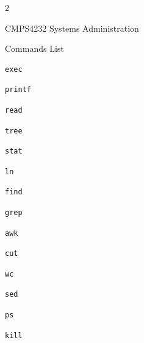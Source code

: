 \documentclass[10pt]{article}
\begin{document}
\begin{multicols*}{2}

\begin{center}
     \Large{CMPS4232 Systems Administration}
\end{center}

\begin{center}
     \large{Commands List}
\end{center}

\begin{lstlisting}
exec
\end{lstlisting}

\begin{lstlisting}
printf
\end{lstlisting}

\begin{lstlisting}
read
\end{lstlisting}

\begin{lstlisting}
tree
\end{lstlisting}

\begin{lstlisting}
stat
\end{lstlisting}

\begin{lstlisting}
ln
\end{lstlisting}

\begin{lstlisting}
find
\end{lstlisting}

\begin{lstlisting}
grep
\end{lstlisting}

\begin{lstlisting}
awk
\end{lstlisting}

\begin{lstlisting}
cut
\end{lstlisting}

\begin{lstlisting}
wc
\end{lstlisting}

\begin{lstlisting}
sed
\end{lstlisting}

\begin{lstlisting}
ps
\end{lstlisting}

\begin{lstlisting}
kill
\end{lstlisting}


\end{multicols*}
\end{document}
